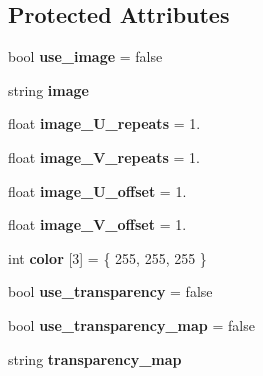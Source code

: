 \subsection*{Protected Attributes}
\begin{DoxyCompactItemize}
\item 
\mbox{\label{classmaterial_a62cd5c71d10fc79149e52d380a92832f}} 
bool {\bfseries use\+\_\+image} = false
\item 
\mbox{\label{classmaterial_a9b88ba5477ecce6dedc304aa2e9c0377}} 
string {\bfseries image}
\item 
\mbox{\label{classmaterial_a4b0e3e365c52f26b77bb1f4a8bf9fc75}} 
float {\bfseries image\+\_\+\+U\+\_\+repeats} = 1.
\item 
\mbox{\label{classmaterial_ac465af4c697700bcac437dcfb1c95000}} 
float {\bfseries image\+\_\+\+V\+\_\+repeats} = 1.
\item 
\mbox{\label{classmaterial_a1f7f477c64806949f2aa55cbaa3c23bc}} 
float {\bfseries image\+\_\+\+U\+\_\+offset} = 1.
\item 
\mbox{\label{classmaterial_aa2af2c634b652eae81e726727a65199f}} 
float {\bfseries image\+\_\+\+V\+\_\+offset} = 1.
\item 
\mbox{\label{classmaterial_aad9ca45a749b3ce86eb9d23fcc055817}} 
int {\bfseries color} \mbox{[}3\mbox{]} = \{ 255, 255, 255 \}
\item 
\mbox{\label{classmaterial_a1c6a200137f056eb06153667292c5649}} 
bool {\bfseries use\+\_\+transparency} = false
\item 
\mbox{\label{classmaterial_a013b5d251a31ac28924b03d34c786ca5}} 
bool {\bfseries use\+\_\+transparency\+\_\+map} = false
\item 
\mbox{\label{classmaterial_a744c40c8110bbcfa64d5dd0a0a83fb9a}} 
string {\bfseries transparency\+\_\+map}
\item 
\mbox{\label{classmaterial_a8751cabfd1519e436b84247a985dad44}} 

\end{DoxyCompactItemize}

